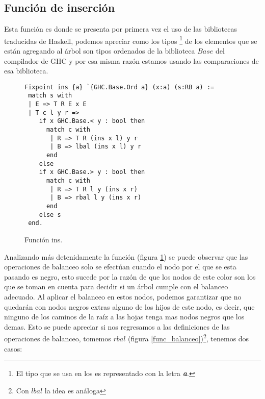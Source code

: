 \subsection {Funci\'on de inserci\'on}
Esta funci\'on es donde se presenta por primera vez el uso de las bibliotecas traducidas de
Haskell, podemos apreciar como los tipos \footnote{El tipo que se usa en los \arns es representado
con la letra \textbf{\textit{a}}.} de los elementos que se est\'an agregando al \'arbol son tipos ordenados de la
biblioteca $Base$ del compilador de GHC y por esa misma raz\'on estamos usando las comparaciones de
esa biblioteca.
\begin{figure}
\centering
\captionsetup{justification=centering}
\begin{verbatim}
Fixpoint ins {a} `{GHC.Base.Ord a} (x:a) (s:RB a) :=
 match s with
 | E => T R E x E
 | T c l y r =>
    if x GHC.Base.< y : bool then
      match c with
       | R => T R (ins x l) y r
       | B => lbal (ins x l) y r
      end
    else
    if x GHC.Base.> y : bool then
      match c with
       | R => T R l y (ins x r)
       | B => rbal l y (ins x r)
      end
    else s
 end.
\end{verbatim}
\caption{Funci\'on ins.}
\label{func_ins}
\end{figure}

Analizando m\'as detenidamente la funci\'on (figura \ref{func_ins}) se puede observar que las
operaciones de balanceo solo se efectúan cuando el nodo por el que se esta pasando es negro, esto
sucede por la raz\'on de que los nodos de este color son los que se toman en cuenta para decidir si
un \'arbol cumple con el balanceo adecuado. Al aplicar el balanceo en estos nodos, podemos garantizar
que no quedar\'an con nodos negros extras alguno de los hijos de este nodo, es decir, que ninguno de
los caminos de la ra\'iz a las hojas tenga mas nodos negros que
los demas. Esto se puede apreciar si nos regresamos a las definiciones de las operaciones de
balanceo, tomemos $rbal$ (figura \ref{func_balanceo})\footnote{Con $lbal$ la idea es an\'aloga}, 
tenemos dos casos:

